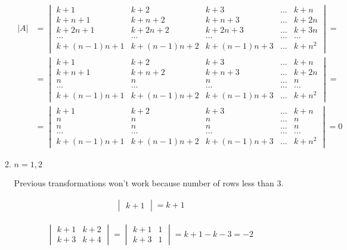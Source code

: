\documentclass{article}
\begin{document}
\begin{enumerate}
\begin{enumerate}
\begin{align*}
|A|&=\begin{vmatrix}
k+1&k+2&k+3&\ldots{}&k+n\\
k+n+1&k+n+2&k+n+3&\ldots{}&k+2n\\
k+2n+1&k+2n+2&k+2n+3&\ldots{}&k+3n\\
\ldots{}&\ldots{}&\ldots{}&\ldots{}&\ldots{}\\
k+(n-1)n+1&k+(n-1)n+2&k+(n-1)n+3&\ldots{}&k+n^2
\end{vmatrix}=\\
&=\begin{vmatrix}
k+1&k+2&k+3&\ldots{}&k+n\\
k+n+1&k+n+2&k+n+3&\ldots{}&k+2n\\
n&n&n&\ldots{}&n\\
\ldots{}&\ldots{}&\ldots{}&\ldots{}&\ldots{}\\
k+(n-1)n+1&k+(n-1)n+2&k+(n-1)n+3&\ldots{}&k+n^2
\end{vmatrix}=\\
&=\begin{vmatrix}
k+1&k+2&k+3&\ldots{}&k+n\\
n&n&n&\ldots{}&n\\
n&n&n&\ldots{}&n\\
\ldots{}&\ldots{}&\ldots{}&\ldots{}&\ldots{}\\
k+(n-1)n+1&k+(n-1)n+2&k+(n-1)n+3&\ldots{}&k+n^2
\end{vmatrix}=0
\end{align*}

\item $n=1,2$

Previous transformations won't work because number of rows less than $3$.

\begin{align*}
\begin{vmatrix}
k+1
\end{vmatrix}=k+1
\end{align*}

\begin{align*}
\begin{vmatrix}
k+1&k+2\\
k+3&k+4
\end{vmatrix}=\begin{vmatrix}
k+1&1\\
k+3&1
\end{vmatrix}=k+1-k-3=-2
\end{align*}

\end{enumerate}

\end{enumerate}
\end{document}
